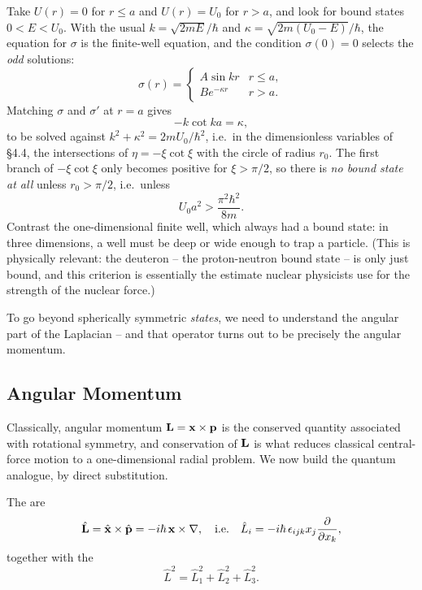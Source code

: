 \documentclass[a4paper]{scrartcl}
\begin{document}
\begin{example}
    Take $U(r) = 0$ for $r \leq a$ and $U(r) = U_0$ for $r > a$, and look for bound states $0 < E < U_0$. With the usual $k = \sqrt{2mE}/\hbar$ and $\kappa = \sqrt{2m(U_0 - E)}/\hbar$, the equation for $\sigma$ is the finite-well equation, and the condition $\sigma(0) = 0$ selects the \emph{odd} solutions:
    $$
    \sigma(r) = \begin{cases}
        A \sin kr & r \leq a, \\
        B e^{-\kappa r} & r > a.
    \end{cases}
    $$
    Matching $\sigma$ and $\sigma'$ at $r = a$ gives
    $$
    -k \cot ka = \kappa,
    $$
    to be solved against $k^2 + \kappa^2 = 2mU_0/\hbar^2$, i.e.\ in the dimensionless variables of \S 4.4, the intersections of $\eta = -\xi \cot \xi$ with the circle of radius $r_0$. The first branch of $-\xi\cot\xi$ only becomes positive for $\xi > \pi/2$, so there is \emph{no bound state at all} unless $r_0 > \pi/2$, i.e.\ unless
    $$
    U_0 a^2 > \frac{\pi^2 \hbar^2}{8m}.
    $$
    Contrast the one-dimensional finite well, which always had a bound state: in three dimensions, a well must be deep or wide enough to trap a particle. (This is physically relevant: the deuteron -- the proton-neutron bound state -- is only just bound, and this criterion is essentially the estimate nuclear physicists use for the strength of the nuclear force.)
\end{example}

To go beyond spherically symmetric \emph{states}, we need to understand the angular part of the Laplacian -- and that operator turns out to be precisely the angular momentum.

\subsection{Angular Momentum}

Classically, angular momentum $\mathbf{L} = \mathbf{x} \times \mathbf{p}$ is the conserved quantity associated with rotational symmetry, and conservation of $\mathbf{L}$ is what reduces classical central-force motion to a one-dimensional radial problem. We now build the quantum analogue, by direct substitution.

\begin{definition}
    The  are
    $$
    \hat{\mathbf{L}} = \hat{\mathbf{x}} \times \hat{\mathbf{p}} = -i \hbar \, \mathbf{x} \times \nabla, \quad \text{i.e.} \quad \hat{L}_i = -i\hbar \, \epsilon_{ijk} x_j \frac{\partial}{\partial x_k},
    $$
    together with the 
    $$
    \hat{L}^2 = \hat{L}_1^2 + \hat{L}_2^2 + \hat{L}_3^2.
    $$
\end{definition}
\end{document}
